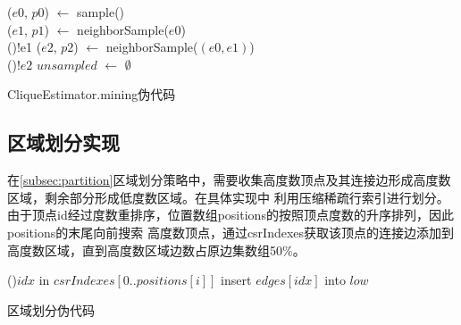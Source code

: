 \documentclass[master]{thesis-uestc}
\begin{document}
\begin{algorithm}[H]
    ($e0$, $p0$) $\leftarrow$ sample()\\
    ($e1$, $p1$) $\leftarrow$ neighborSample($e0$)\\
    \If(){!e1}{
    }
    ($e2$, $p2$) $\leftarrow$ neighborSample($(e0, e1)$)\\
    \If(){!$e2$}{
    }
    $unsampled$ $\leftarrow$ $\emptyset$\\
    \caption{CliqueEstimator.mining伪代码}
    \label{alg:clique-est}
\end{algorithm}

 
\subsection{区域划分实现}
\label{subsec:partition-impl}
    在\ref{subsec:partition}区域划分策略中，需要收集高度数顶点及其连接边形成高度数区域，剩余部分形成低度数区域。在具体实现中
利用压缩稀疏行索引进行划分。由于顶点id经过度数重排序，位置数组positions的按照顶点度数的升序排列，因此positions的末尾向前搜索
高度数顶点，通过csrIndexes获取该顶点的连接边添加到高度数区域，直到高度数区域边数占原边集数组50\%。

\begin{algorithm}[H]
    \For(){$idx$ in $csrIndexes[0..positions[i]]$}{
            insert $edges[idx]$ into $low$
    }
    \caption{区域划分伪代码}
    \label{alg:patition}
\end{algorithm}
\end{document}
